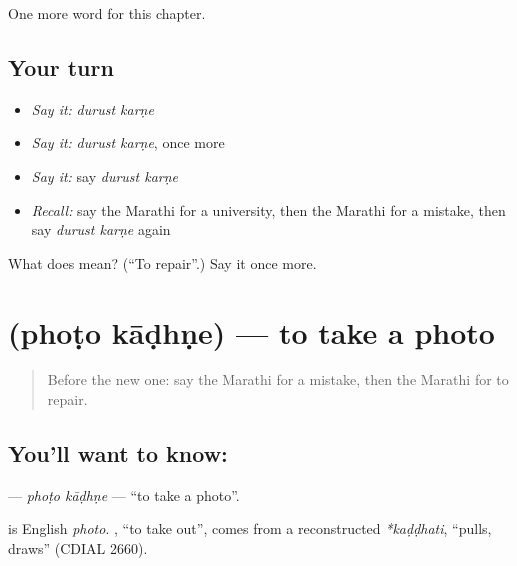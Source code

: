 \begin{grammarlens}[title={What you've built}]
One more word for this chapter.
\end{grammarlens}

\subsection*{Your turn}
\begin{itemize}
\raggedright
  \item \emph{Say it:} \emph{durust karṇe}
  \item \emph{Say it:} \emph{durust karṇe}, once more
  \item \emph{Say it:} say \emph{durust karṇe}
  \item \emph{Recall:} say the Marathi for a university, then the Marathi for a mistake, then say \emph{durust karṇe} again
\end{itemize}

\begin{tcolorbox}[breakable,colback=teal!4,colframe=teal!35!black,title={Before you move on}]
What does   mean? (\textquotedblleft{}To repair\textquotedblright{}.) Say it once more.
\end{tcolorbox}
\section[\texorpdfstring{\mr{फोटो} \mr{काढणे} (phoṭo kāḍhṇe)}{फोटो काढणे (phoṭo kāḍhṇe)}]{  (phoṭo kāḍhṇe) — to take a photo}

\label{lesson:MR-C223-photo-kadhne}



\begin{quote}
Before the new one: say the Marathi for a mistake, then the Marathi for to repair.
\end{quote}

\subsection*{You'll want to know:  }
\textbf{ } — \emph{phoṭo kāḍhṇe} — \textquotedblleft{}to take a photo\textquotedblright{}.

\begin{cousinweb}
\textbf{} is English \emph{photo}. \textbf{}, \textquotedblleft{}to take out\textquotedblright{}, comes from a reconstructed \emph{*kaḍḍhati}, \textquotedblleft{}pulls, draws\textquotedblright{} (CDIAL 2660).
\end{cousinweb}

